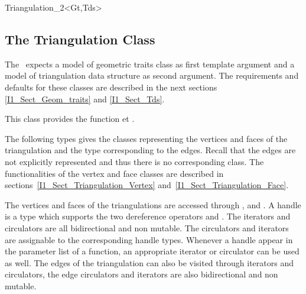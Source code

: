 \begin{ccClassTemplate}{Triangulation_2<Gt,Tds>}
\subsection{The Triangulation Class \protect \ccClassTemplateName} 

The \ccClassTemplateName\  expects a model of  {geometric traits} class
as first template argument and a model of {triangulation data structure}
as second argument. The requirements  and defaults for these classes 
are described in the next sections \ref{I1_Sect_Geom_traits}
and \ref{I1_Sect_Tds}.


This class provides the function  et .

\ccTypes
{}
\ccThreeToTwo

\ccGlue
{}

\ccGlue
{}
\ccGlue
{}

The following types gives the classes representing the vertices and faces
 of the triangulation and the type corresponding to the edges.
Recall that the edges are not explicitly represented and thus there is no corresponding class.
The functionalities of the vertex and face classes
 are described in sections~\ref{I1_Sect_Triangulation_Vertex}
and~\ref{I1_Sect_Triangulation_Face}.

\ccGlue
{}
\ccGlue
{}

\ccThreeToTwo
The vertices and faces of the triangulations are accessed through 
,  and . 
 A handle is a type which supports the two
dereference operators  and .
The iterators and circulators
are all bidirectional and non mutable.
The circulators and iterators are assignable to the 
corresponding handle types. Whenever a handle appear in the parameter 
list of a function, an appropriate iterator or circulator can be used as well.
The edges of the triangulation can also be visited through iterators
and circulators,
the edge circulators and iterators
are also bidirectional and non mutable.


\end{ccClassTemplate}
